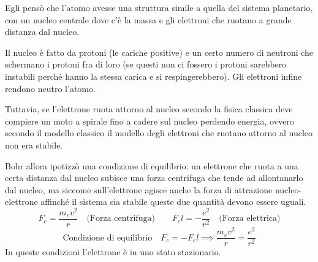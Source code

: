Egli pensò che l'atomo avesse una struttura simile a quella del sistema planetario, con un nucleo centrale dove c'è la massa e gli elettroni che ruotano a grande distanza dal nucleo.

Il nucleo è fatto da protoni (le cariche positive) e un certo numero di neutroni che schermano i protoni fra di loro (se questi non ci fossero i protoni sarebbero instabili perché hanno la stessa carica e si respingerebbero). Gli elettroni infine rendono neutro l'atomo.

Tuttavia, se l'elettrone ruota attorno al nucleo secondo la fisica classica deve compiere un moto a spirale fino a cadere sul nucleo perdendo energia, ovvero secondo il modello classico il modello degli elettroni che ruotano attorno al nucleo non era stabile.

Bohr allora ipotizzò una condizione di equilibrio: un elettrone che ruota a una certa distanza dal nucleo subisce una forza centrifuga che tende ad allontanarlo dal nucleo, ma siccome sull'elettrone agisce anche la forza di attrazione nucleo-elettrone affinché il sistema sia stabile queste due quantità devono essere uguali.
$$F_c=\frac{m_ev^2}{r} \quad \text{(Forza centrifuga)} \qquad F_el=-\frac{e^2}{r^2} \quad \text{(Forza elettrica)}$$
$$\text{Condizione di equilibrio} \quad F_c=-F_el \implies \frac{m_ev^2}{r}=\frac{e^2}{r^2}$$
In queste condizioni l'elettrone è in uno stato stazionario.

